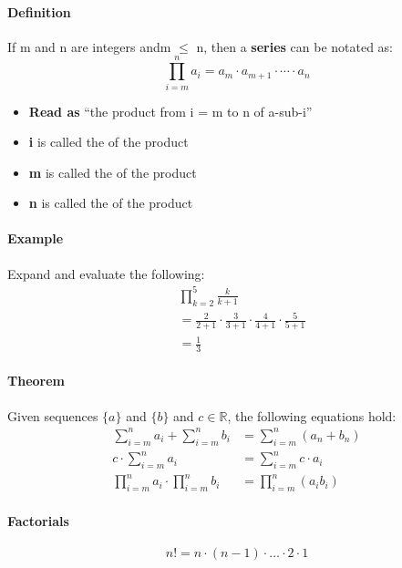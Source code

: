 \paragraph*{Definition}
If m and n are integers andm $\leq$ n, then a \textbf{series} can be notated as:
\begin{equation*}
    \prod_{i=m}^n a_i = a_m \cdot a_{m+1} \cdot \cdots \cdot a_n
\end{equation*} 

\begin{itemize}
    \item \textbf{Read as} ``the product from i = m to n of a-sub-i''
    \item \textbf{i} is called the  of the product
    \item \textbf{m} is called the  of the product
    \item \textbf{n} is called the  of the product
\end{itemize}

\paragraph*{Example}
Expand and evaluate the following:
\begin{align*}
    & \prod_{k=2}^{5} \frac{k}{k+1}\\
    &= \frac{2}{2+1} \cdot \frac{3}{3+1} \cdot \frac{4}{4+1} \cdot \frac{5}{5+1}\\
    &= \frac{1}{3}
\end{align*}

\paragraph*{Theorem}
Given sequences $\{a\}$ and $\{b\}$ and $c \in \mathbb{R}$, the following equations hold:
\begin{align*}
    \sum_{i=m}^{n} a_i + \sum_{i=m}^{n} b_i &= \sum_{i=m}^{n} (a_n + b_n)\\
    c \cdot \sum_{i=m}^{n} a_i &= \sum_{i=m}^{n} c \cdot a_i\\
    \prod_{i=m}^{n} a_i \cdot \prod_{i=m}^{n} b_i &= \prod_{i=m}^{n} (a_i b_i)
\end{align*}

\paragraph*{Factorials}
\begin{equation*}
    n! = n \cdot (n-1) \cdot \dots \cdot 2 \cdot 1
\end{equation*}

